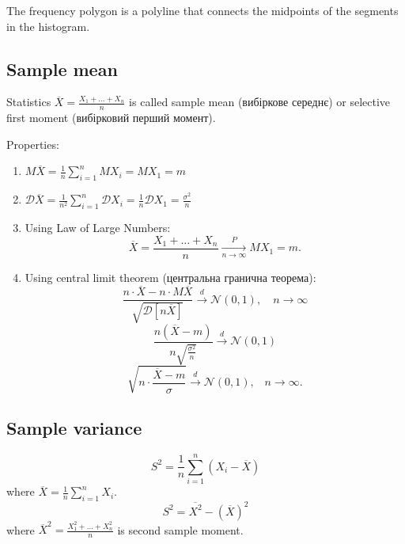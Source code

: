 \begin{definition}
The frequency polygon is a polyline that connects the midpoints of the segments in the histogram.
\end{definition}



\subsection{Sample mean}

\begin{definition}
    Statistics $\overline{X} = \frac{X_1 + \ldots + X_n}{n}$ is called
    sample mean (вибіркове середнє) or selective first moment
    (вибірковий перший момент).
\end{definition}

Properties:
\begin{enumerate}
    \item $M \overline{X} = \frac{1}{n} \sum_{i=1}^{n} MX_i = MX_1 = m$ 
    \item $\mathcal{D}\overline{X} = \frac{1}{n^2} \sum_{i=1}^{n} \mathcal{D}X_i = \frac{1}{n} \mathcal{D}X_1 = \frac{\sigma^2}{ n}$ 
    \item Using Law of Large Numbers:
        \[
            \overline{X} = \frac{X_1 + \ldots + X_n}{n}
            \underset{n\to\infty}{\overset{P}{\to}}
            MX_1 = m
        .\] 
    \item Using central limit theorem (центральна гранична теорема):
        \[
            \frac{n \cdot \overline{X} - n \cdot M\overline{X}}{\sqrt{\mathcal{D}[n\overline{X}]} }
            \overset{d}{\to}
            \mathcal{N}(0,1), \quad n \to \infty
        \] 
        \[
            \frac{n\left( \overline{X} - m \right) }{n \sqrt{\frac{\sigma^2}{n}} }
            \overset{d}{\to}
            \mathcal{N}(0,1)
        \] 
        \[
            \sqrt{n \cdot \frac{\overline{X} - m}{\sigma}}
            \overset{d}{\to}
            \mathcal{N}(0,1), \;\;\; n \to \infty
        .\] 
\end{enumerate}



\subsection{Sample variance}

\[
S^2 = \frac{1}{n} \sum_{i=1}^{n} \left(  X_i - \overline{X} \right) 
\] 
where $\overline{X} = \frac{1}{n} \sum_{i=1}^{n} X_i$.
\[
S^2 = \overline{X^2} - \left( \overline{X} \right) ^2
\] 
where $\overline{X}^2 = \frac{X_1^2 + \ldots + X_n^2}{n}$ is second sample moment.

